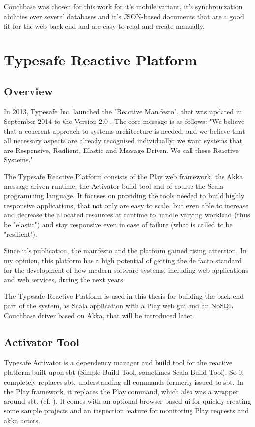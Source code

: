 Couchbase was chosen for this work for it's mobile variant, it's synchronization abilities over several databases and it's JSON-based documents that are a good fit for the web back end and are easy to read and create manually.


\section{Typesafe Reactive Platform}

\subsection{Overview}

In 2013, Typesafe Inc. launched the "Reactive Manifesto", that was updated in September 2014 to the Version 2.0 \cite{reactivemanifesto}. The core message is as follows: "We believe that a coherent approach to systems architecture is needed, and we believe that all necessary aspects are already recognised individually: we want systems that are Responsive, Resilient, Elastic and Message Driven. We call these Reactive Systems."

The Typesafe Reactive Platform consists of the Play web framework, the Akka message driven runtime, the Activator build tool and of course the Scala programming language. It focuses on providing the tools needed to build highly responsive applications, that not only are easy to scale, but even able to increase and decrease the allocated resources at runtime to handle varying workload (thus be "elastic") and stay responsive even in case of failure (what is called to be "resilient").

Since it's publication, the manifesto and the platform gained rising attention. In my opinion, this platform has a high potential of getting the de facto standard for the development of how modern software systems, including web applications and web services, during the next years.

The Typesafe Reactive Platform is used in this thesis for building the back end part of the system, as Scala application with a Play web gui and an NoSQL Couchbase driver based on Akka, that will be introduced later. %

\subsection{Activator Tool}

Typesafe Activator is a dependency manager and build tool for the reactive platform built upon sbt (Simple Build Tool, sometimes Scala Build Tool). So it completely replaces sbt, understanding all commands formerly issued to sbt. In the Play framework, it replaces the Play command, which also was a wrapper around sbt. (cf. \cite{typesafeact}). It comes with an optional browser based ui for quickly creating some sample projects and an inspection feature for monitoring Play requests and akka actors. 

